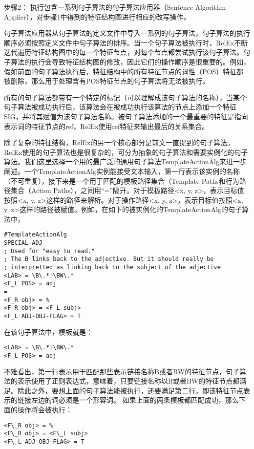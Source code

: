 \rm{步骤2： 执行包含一系列句子算法的句子算法应用器（Sentence Algorithm Applier），对步骤1中得到的特征结构图进行相应的改写操作。}

句子算法应用器从句子算法的定义文件中导入一系列的句子算法，句子算法的执行顺序必须按照定义文件中句子算法的排序。当一个句子算法被执行时，RelEx不断迭代遍历特征结构图中的每一个特征节点，对每个节点都尝试执行该句子算法。句子算法的执行会导致特征结构图的修改，因此它们的操作顺序是很重要的。例如，假如前面的句子算法执行后，特征结构中的所有特征节点的词性（POS）特征都被删除，那么用于处理含有POS特征节点的句子算法将无法被执行。

所有的句子算法都带有一个特定的标记（可以理解成该句子算法的名称），当某个句子算法被成功执行后，该算法会在被成功执行该算法的节点上添加一个特征SIG，并将其赋值为该句子算法名称。被句子算法添加的一个最重要的特征是指向表示词的特征节点的ref，RelEx使用ref特征来输出最后的关系集合。

除了复杂的特征结构，RelEx的另一个核心部分是前文一直提到的句子算法。RelEx使用的句子算法也是很复杂的，可分为抽象的句子算法和需要实例化的句子算法。我们这里选择一个用的最广泛的通用句子算法TemplateActionAlg来进一步阐述。一个TemplateActionAlg实例能接受文本输入，第一行表示该实例的名称（不可重复），接下来是一个用于匹配的模板路径集合（Template Paths和行为路径集合（Action Paths），之间用“=”隔开。对于模板路径<x, y, z>，表示目标值按照<x, y, z>这样的路径来解析。对于操作路径<x, y, z>，表示目标值按照<x, y, z>这样的路径被赋值。例如，在如下的被实例化的TemplateActionAlg的句子算法中，

\begin{verbatim}
#TemplateActionAlg
SPECIAL-ADJ
; Used for "easy to read." 
; The B links back to the adjective. But it should really be
; interpretted as linking back to the subject of the adjective
<LAB> = \B\.*|\BW\.*
<F_L POS> = adj
=
<F_R obj> = %
<F_R obj> = <F_L subj>
<F_L ADJ-OBJ-FLAG> = T
\end{verbatim}
在该句子算法中，模板就是：
\begin{verbatim}
<LAB> = \B\.*|\BW\.*
<F_L POS> = adj
\end{verbatim}

不难看出，第一行表示用于匹配那些表示链接名称B或者BW的特征节点，句子算法的表示使用了正则表达式，意味着，只要链接名称以B或者BW的特征节点都满足。除此之外，要想上面的句子算法能被执行，还要满足第二行，即该特征节点表示的链接左边的词必须是一个形容词。
如果上面的两条模板都匹配成功，那么下面的操作将会被执行：
\begin{verbatim}
<F\_R obj> = %
<F\_R obj> = <F\_L subj>
<F\_L ADJ-OBJ-FLAG> = T
\end{verbatim}

